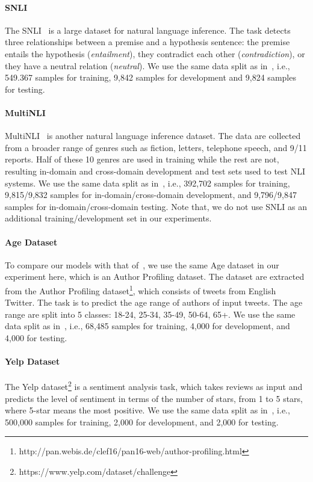 \documentclass[11pt]{article}
\begin{document}
\paragraph{SNLI} The SNLI~\cite{DBLP:conf/emnlp/BowmanAPM15} is a large dataset for natural language inference. The task detects three relationships between a premise and a hypothesis sentence: the premise entails the hypothesis (\textit{entailment}), they contradict each other (\textit{contradiction}), or they have a neutral relation (\textit{neutral}). We use the same data split as in~, i.e., 549.367 samples for training, 9,842 samples for development and 9,824 samples for testing. 

\paragraph{MultiNLI} MultiNLI~\cite{DBLP:journals/corr/WilliamsNB17} is another natural language inference dataset. The data are collected from a broader range of genres such as fiction, letters, telephone speech, and 9/11 reports. Half of these 10 genres are used in training while the rest are not, resulting in-domain and cross-domain development and test sets used to test NLI systems. We use the same data split as in~, i.e., 392,702 samples for training, 9,815/9,832 samples for in-domain/cross-domain development, and 9,796/9,847 samples for in-domain/cross-domain testing. Note that, we do not use SNLI as an additional training/development set in our experiments.

\paragraph{Age Dataset} To compare our models with that of~, we use the same Age dataset in our experiment here, which is an Author Profiling dataset. The dataset are extracted from the Author Profiling dataset\footnote{http://pan.webis.de/clef16/pan16-web/author-profiling.html}, which consists of tweets from English Twitter. The task is to predict the age range of authors of input tweets. The age range are split into 5 classes: 18-24, 25-34, 35-49, 50-64, 65+. We use the same data split as in~, i.e., 68,485 samples for training, 4,000 for development, and 4,000 for testing. 

\paragraph{Yelp Dataset} The Yelp dataset\footnote{https://www.yelp.com/dataset/challenge} is a sentiment analysis task, which takes reviews as input and predicts the level of sentiment in terms of the number of stars, from 1 to 5 stars, where 5-star means the most positive. We use the same data split as in~, i.e., 500,000 samples for training, 2,000 for development, and 2,000 for testing.
\end{document}
